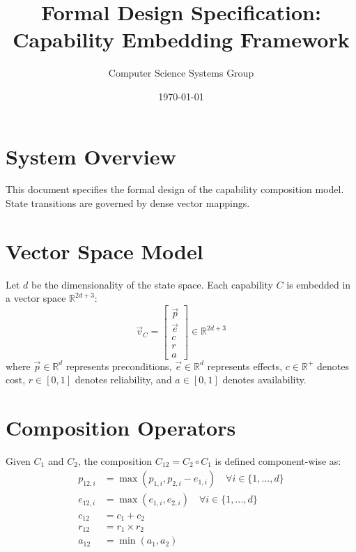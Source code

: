 \documentclass[11pt,a4paper]{article}
\title{Formal Design Specification: Capability Embedding Framework}
\author{Computer Science Systems Group}
\date{\today}
\begin{document}
\maketitle

\section{System Overview}
This document specifies the formal design of the capability composition model. State transitions are governed by dense vector mappings.

\section{Vector Space Model}
Let $d$ be the dimensionality of the state space. Each capability $C$ is embedded in a vector space $\mathbb{R}^{2d+3}$:
\begin{equation}
\vec{v}_C = \begin{bmatrix} \vec{p} \\ \vec{e} \\ c \\ r \\ a \end{bmatrix} \in \mathbb{R}^{2d+3}
\end{equation}
where $\vec{p} \in \mathbb{R}^d$ represents preconditions, $\vec{e} \in \mathbb{R}^d$ represents effects, $c \in \mathbb{R}^+$ denotes cost, $r \in [0, 1]$ denotes reliability, and $a \in [0, 1]$ denotes availability.

\section{Composition Operators}
Given $C_1$ and $C_2$, the composition $C_{12} = C_2 \circ C_1$ is defined component-wise as:
\begin{align}
p_{12, i} &= \max(p_{1, i}, p_{2, i} - e_{1, i}) \quad \forall i \in \{1, \dots, d\} \\
e_{12, i} &= \max(e_{1, i}, e_{2, i}) \quad \forall i \in \{1, \dots, d\} \\
c_{12} &= c_1 + c_2 \\
r_{12} &= r_1 \times r_2 \\
a_{12} &= \min(a_1, a_2)
\end{align}
\end{document}
